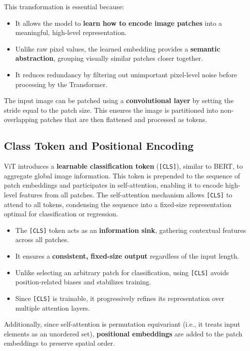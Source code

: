 \noindent
This transformation is essential because:
\begin{itemize}
    \item It allows the model to \textbf{learn how to encode image patches} into a meaningful, high-level representation.
    \item Unlike raw pixel values, the learned embedding provides a \textbf{semantic abstraction}, grouping visually similar patches closer together.
    \item It reduces redundancy by filtering out unimportant pixel-level noise before processing by the Transformer.
\end{itemize}

\noindent
The input image can be patched using a \textbf{convolutional layer} by setting the stride equal to the patch size. This ensures the image is partitioned into non-overlapping patches that are then flattened and processed as tokens.

\subsection{Class Token and Positional Encoding}
\label{sec:chapter18_vit_class_token}

\noindent
ViT introduces a \textbf{learnable classification token} (\texttt{[CLS]}), similar to BERT, to aggregate global image information. This token is prepended to the sequence of patch embeddings and participates in self-attention, enabling it to encode high-level features from all patches. The self-attention mechanism allows \texttt{[CLS]} to attend to all tokens, condensing the sequence into a fixed-size representation optimal for classification or regression.

\begin{itemize}
    \item The \texttt{[CLS]} token acts as an \textbf{information sink}, gathering contextual features across all patches.
    \item It ensures a \textbf{consistent, fixed-size output} regardless of the input length.
    \item Unlike selecting an arbitrary patch for classification, using \texttt{[CLS]} avoids position-related biases and stabilizes training.
    \item Since \texttt{[CLS]} is trainable, it progressively refines its representation over multiple attention layers.
\end{itemize}

\noindent
Additionally, since self-attention is permutation equivariant (i.e., it treats input elements as an unordered set), \textbf{positional embeddings} are added to the patch embeddings to preserve spatial order.

